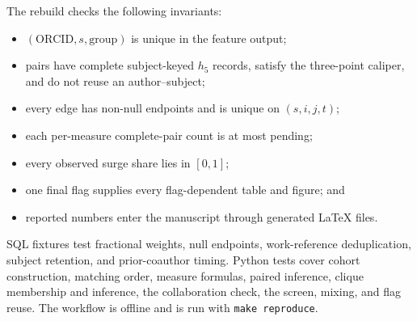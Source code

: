 \documentclass[12pt]{article}
\providecommand{\MatchedPairCount}{pending}
\begin{document}
The rebuild checks the following invariants:
\begin{itemize}
  \item $(\mathrm{ORCID},s,\mathrm{group})$ is unique in the feature output;
  \item pairs have complete subject-keyed $h_5$ records, satisfy the three-point caliper, and do not reuse an author--subject;
  \item every edge has non-null endpoints and is unique on $(s,i,j,t)$;
  \item each per-measure complete-pair count is at most \MatchedPairCount;
  \item every observed surge share lies in $[0,1]$;
  \item one final flag supplies every flag-dependent table and figure; and
  \item reported numbers enter the manuscript through generated LaTeX files.
\end{itemize}
SQL fixtures test fractional weights, null endpoints, work-reference deduplication, subject retention, and prior-coauthor timing.  Python tests cover cohort construction, matching order, measure formulas, paired inference, clique membership and inference, the collaboration check, the screen, mixing, and flag reuse.  The workflow is offline and is run with \texttt{make reproduce}.
\end{document}
